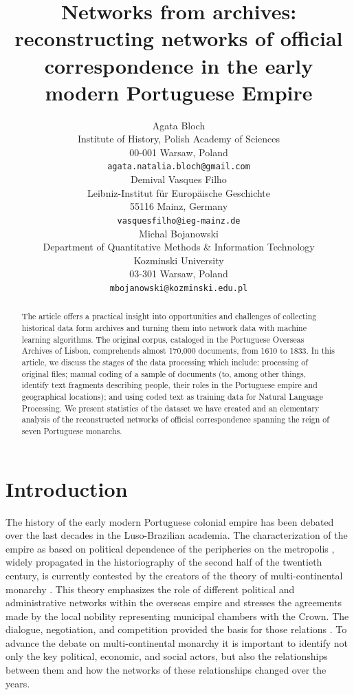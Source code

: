 \documentclass{article}
\title{Networks from archives: reconstructing networks of official correspondence in the early modern Portuguese Empire}
\author{
  Agata Bloch \\%
  Institute of History, Polish Academy of Sciences \\
  00-001 Warsaw, Poland \\
  \texttt{agata.natalia.bloch@gmail.com} \\
   \And
 Demival Vasques Filho \\
	Leibniz-Institut f\"ur Europ\"aische Geschichte \\
	55116 Mainz, Germany\\
  \texttt{vasquesfilho@ieg-mainz.de} \\
   \And
  Michal Bojanowski \\
  Department of Quantitative Methods \& Information Technology \\
  Kozminski University\\
  03-301 Warsaw, Poland \\
  \texttt{mbojanowski@kozminski.edu.pl} \\
}
\begin{document}
\maketitle

\begin{abstract}
The article offers a practical insight into opportunities and challenges of collecting historical data form archives and turning them into network data with machine learning algorithms. The original corpus, cataloged in the Portuguese Overseas Archives of Lisbon, comprehends almost 170,000 documents, from 1610 to 1833. In this article, we discuss the stages of the data processing which include: processing of original files; manual coding of a sample of documents (to, among other things, identify text fragments describing people, their roles in the Portuguese empire and geographical locations); and using coded text as training data for Natural Language Processing. We present statistics of the dataset we have created and an elementary analysis of the reconstructed networks of official correspondence spanning the reign of seven Portuguese monarchs. 
\end{abstract}




\section{Introduction}
The history of the early modern Portuguese colonial empire has been debated over the last decades in the Luso-Brazilian academia. The characterization of the empire as based on political dependence of the peripheries on the metropolis \cite{prado_colonial_1967,da_costa_da_1997,da_costa_brazilian_2000,fernandes_beyond_1969,novais_portugal_1995}, widely propagated in the historiography of the second half of the twentieth century, is currently contested by the creators of the theory of multi-continental monarchy \cite{fragoso_monarquia_2009,guedes_dinamica_2013,fragoso_um_2017}. This theory emphasizes the role of different political and administrative networks within the overseas empire and stresses the agreements made by the local nobility representing municipal chambers with the Crown. The dialogue, negotiation, and competition provided the basis for those relations \cite{fragoso_monarquia_2012}. To advance the debate on multi-continental monarchy it is important to identify not only the key political, economic, and social actors, but also the relationships between them and how the networks of these relationships changed over the years. 
\end{document}
